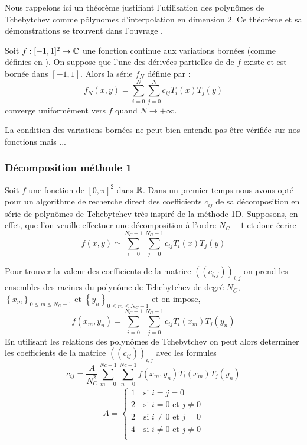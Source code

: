 \documentclass[10pt]{article}
\begin{document}
\begin{multicols}{2}
Nous rappelons ici un théorème justifiant l'utilisation des polynômes de Tchebytchev comme pôlynomes d'interpolation en dimension 2. Ce théorème et sa démonstrations se trouvent dans l'ouvrage \cite{Tchebychev}. 

\begin{theorem}
  Soit $f : [-1,1]^2 \rightarrow \mathbb{C}$ une fonction continue aux variations bornées (comme définies en \cite{Tchebychev}). On suppose que l'une des dérivées partielles de de $f$ existe et est bornée dans $[-1,1]$. Alors la série $f_N$ définie par :
\begin{equation}
f_N(x,y) = \sum_{i=0} ^{N} \sum_{j=0} ^{N} c_{ij} T_i(x)T_j(y)
\end{equation}
converge uniformément vers $f$ quand $N \rightarrow +\infty$.
\end{theorem}

La condition des variations bornées ne peut bien entendu pas être vérifiée sur nos fonctions mais ...

\vspace*{11pt}

\subsubsection{Décomposition méthode 1}

Soit $f$ une fonction de $[0,\pi]^2$ dans $\mathbb{R}$. Dans un premier temps nous avons opté pour un algorithme de recherche direct des coefficients $c_{ij}$ de sa décomposition en série de polynômes de Tchebytchev très inspiré de la méthode 1D. Supposons, en effet, que l'on veuille effectuer une décomposition à l'ordre $N_C -1$ et donc écrire
\begin{equation}
  f(x,y) \simeq \sum_{i=0}^{N_C-1}\sum_{j=0}^{N_C-1} c_{ij} T_i(x)T_j(y)
\end{equation}

Pour trouver la valeur des coefficients de la matrice $((c_{i,j}))_{i,j}$ on prend les ensembles des racines du polynôme de Tchebytchev  de degré $N_C$, $\left\{x_m\right\}_{0\le m \le N_C-1}$ et $\left\{y_n\right\}_{0\le m \le N_C-1}$ et on impose,
\begin{equation}
  f(x_m, y_n) = \sum_{i=0}^{N_C-1}\sum_{j=0}^{N_C-1} c_{ij} T_i(x_m)T_j(y_n)
\end{equation}
En utilisant les relations des polynômes de Tchebytchev on peut alors determiner les coefficients de la matrice $((c_{ij}))_{i,j}$ avec les formules
\begin{equation}
 c_{ij} = \frac{A}{N_C^2} \sum_{m=0}^{Nc-1} \sum_{n=0}^{Nc-1} f(x_m, y_n)T_i(x_m)T_j(y_n)
\end{equation}
\begin{align}
  A = 
  \begin{cases}
    1 \quad \text{si } i = j = 0 \\
    2 \quad \text{si } i = 0 \text{ et } j \neq 0 \\
    2 \quad \text{si } i \neq 0 \text{ et } j = 0 \\
    4 \quad \text{si } i \neq 0 \text{ et } j \neq 0 \\
  \end{cases}
\end{align}


\end{multicols}
\end{document}
